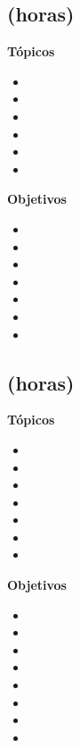 \subsection{\OSUNODef  (\OSUNOHours horas)}\label{sec:BOK-OS1}

\textbf{Tópicos}
\begin{itemize}
	\item \OSUNOTopicRol
	\item \OSUNOTopicHistoria
	\item \OSUNOTopicFuncionalidad
	\item \OSUNOTopicMecanismos
	\item \OSUNOTopicTopicos
	\item \OSUNOTopicInfluencias
\end{itemize}

\textbf{Objetivos}
\begin{itemize}
	\item \OSUNOObjUNO
	\item \OSUNOObjDOS
	\item \OSUNOObjTRES
	\item \OSUNOObjCUATRO
	\item \OSUNOObjCINCO
	\item \OSUNOObjSEIS
	\item \OSUNOObjSIETE
\end{itemize}

\subsection{\OSDOSDef  (\OSDOSHours horas)}\label{sec:BOK-OS2}

\textbf{Tópicos}
\begin{itemize}
	\item \OSDOSTopicMetodos
	\item \OSDOSTopicAbstracciones
	\item \OSDOSTopicConceptos
	\item \OSDOSTopicNecesidad
	\item \OSDOSTopicOrganizacion
	\item \OSDOSTopicInterrupciones
	\item \OSDOSTopicConcepto
\end{itemize}

\textbf{Objetivos}
\begin{itemize}
	\item \OSDOSObjUNO
	\item \OSDOSObjDOS
	\item \OSDOSObjTRES
	\item \OSDOSObjCUATRO
	\item \OSDOSObjCINCO
	\item \OSDOSObjSEIS
	\item \OSDOSObjSIETE
	\item \OSDOSObjOCHO
\end{itemize}

